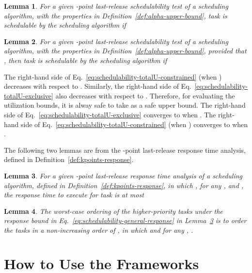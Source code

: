 \documentclass[10pt,conference]{IEEEtran}
\newtheorem{lemma}{Lemma}
\begin{document}
\begin{lemma}
\label{lemma:framework-totalU-exclusive}
For a given -point last-release schedulability test of a scheduling 
algorithm, with the properties in Definition~\ref{def:alpha-upper-bound}, 
task  is schedulable by the scheduling
algorithm if 

\end{lemma}

\begin{lemma}
\label{lemma:framework-totalU-constrained}
For a given -point last-release schedulability test of a scheduling 
algorithm, with the properties in Definition~\ref{def:alpha-upper-bound}, 
provided that , 
then task  is schedulable by the scheduling
algorithm if  
{\small
 
}
\end{lemma}

The right-hand side of
Eq.~\eqref{eq:schedulability-totalU-constrained} (when
) decreases with
respect to . Similarly, the right-hand side of
Eq.~\eqref{eq:schedulability-totalU-exclusive} also decreases with
respect to . Therefore, for evaluating the utilization bounds, it
is alway safe to take  as a safe upper bound. The
right-hand side of Eq.~\eqref{eq:schedulability-totalU-exclusive}
converges to  when .  The right-hand side of
Eq.~\eqref{eq:schedulability-totalU-constrained}  (when
) converges to
 when
.



The following two lemmas are from the -point last-release response time analysis, defined in
Definition~\ref{def:kpoints-response}.
\begin{lemma}
\label{lemma:framework-general-response}
For a given -point last-release response time analysis of a scheduling 
algorithm, defined in
Definition~\ref{def:kpoints-response},
in which ,  for any
,  and , the response time to execute  for task
 is at most

\end{lemma}



\begin{lemma}
  \label{lemma:general-response-sorting}
  The worst-case ordering  of the  higher-priority tasks
  under the response bound in
  Eq.~\eqref{eq:schedulability-general-response} in Lemma~\ref{lemma:framework-general-response} is to order the tasks in a non-increasing order of ,
 in which  and  for any , .
\end{lemma}

\section{How to Use the Frameworks}
\label{sec:use-framework}
\end{document}
